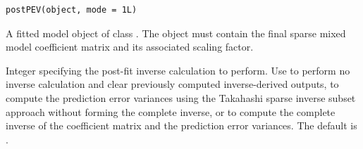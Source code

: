 \documentclass[a4paper]{book}
\begin{document}
%
\begin{Usage}
\begin{verbatim}
postPEV(object, mode = 1L)
\end{verbatim}
\end{Usage}
%
\begin{Arguments}
\begin{ldescription}
\item[\code{object}] 
A fitted model object of class . The object must contain the final sparse mixed model coefficient matrix and its associated scaling factor.

\item[\code{mode}] 
Integer specifying the post-fit inverse calculation to perform. Use  to perform no inverse calculation and clear previously computed inverse-derived outputs,  to compute the prediction error variances using the Takahashi sparse inverse subset approach without forming the complete inverse, or  to compute the complete inverse of the coefficient matrix and the prediction error variances. The default is .

\end{ldescription}
\end{Arguments}
%
\end{document}
